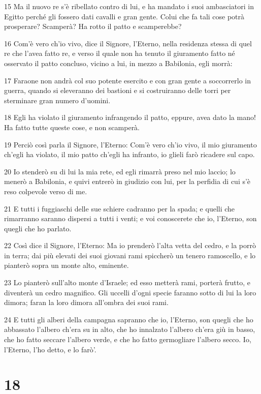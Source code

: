 \par 15 Ma il nuovo re s'è ribellato contro di lui, e ha mandato i suoi ambasciatori in Egitto perché gli fossero dati cavalli e gran gente. Colui che fa tali cose potrà prosperare? Scamperà? Ha rotto il patto e scamperebbe?
\par 16 Com'è vero ch'io vivo, dice il Signore, l'Eterno, nella residenza stessa di quel re che l'avea fatto re, e verso il quale non ha tenuto il giuramento fatto né osservato il patto concluso, vicino a lui, in mezzo a Babilonia, egli morrà:
\par 17 Faraone non andrà col suo potente esercito e con gran gente a soccorrerlo in guerra, quando si eleveranno dei bastioni e si costruiranno delle torri per sterminare gran numero d'uomini.
\par 18 Egli ha violato il giuramento infrangendo il patto, eppure, avea dato la mano! Ha fatto tutte queste cose, e non scamperà.
\par 19 Perciò così parla il Signore, l'Eterno: Com'è vero ch'io vivo, il mio giuramento ch'egli ha violato, il mio patto ch'egli ha infranto, io glieli farò ricadere sul capo.
\par 20 Io stenderò su di lui la mia rete, ed egli rimarrà preso nel mio laccio; lo menerò a Babilonia, e quivi entrerò in giudizio con lui, per la perfidia di cui s'è reso colpevole verso di me.
\par 21 E tutti i fuggiaschi delle sue schiere cadranno per la spada; e quelli che rimarranno saranno dispersi a tutti i venti; e voi conoscerete che io, l'Eterno, son quegli che ho parlato.
\par 22 Così dice il Signore, l'Eterno: Ma io prenderò l'alta vetta del cedro, e la porrò in terra; dai più elevati dei suoi giovani rami spiccherò un tenero ramoscello, e lo pianterò sopra un monte alto, eminente.
\par 23 Lo pianterò sull'alto monte d'Israele; ed esso metterà rami, porterà frutto, e diventerà un cedro magnifico. Gli uccelli d'ogni specie faranno sotto di lui la loro dimora; faran la loro dimora all'ombra dei suoi rami.
\par 24 E tutti gli alberi della campagna sapranno che io, l'Eterno, son quegli che ho abbassato l'albero ch'era su in alto, che ho innalzato l'albero ch'era giù in basso, che ho fatto seccare l'albero verde, e che ho fatto germogliare l'albero secco. Io, l'Eterno, l'ho detto, e lo farò'.

\chapter{18}

